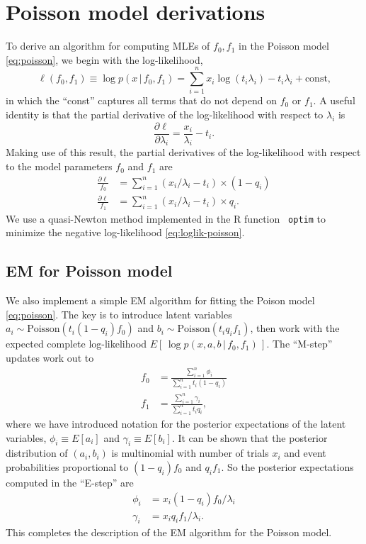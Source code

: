 \documentclass[final]{siamart171218}
\begin{document}
\section{Poisson model derivations}

To derive an algorithm for computing MLEs of $f_0, f_1$ in the Poisson
model \eqref{eq:poisson}, we begin with the log-likelihood,
\begin{equation}
\ell(f_0, f_1) \equiv \log p(x \,|\, f_0, f_1) = 
\sum_{i=1}^n x_i \log (t_i \lambda_i) - t_i \lambda_i +
\mbox{const,}
\label{eq:loglik-poisson}
\end{equation}
in which the ``const'' captures all terms that do not depend on $f_0$
or $f_1$. A useful identity is that the partial derivative of the
log-likelihood with respect to $\lambda_i$ is
\begin{equation*}
\frac{\partial\ell}{\partial\lambda_i} = \frac{x_i}{\lambda_i} - t_i.
\end{equation*}
Making use of this result, the partial derivatives of the
log-likelihood with respect to the model parameters $f_0$ and $f_1$
are
\begin{align}
\frac{\partial\ell}{f_0} &= 
\sum_{i=1}^n (x_i/\lambda_i - t_i) \times (1-q_i) \\
\frac{\partial\ell}{f_1} &= 
\sum_{i=1}^n (x_i/\lambda_i - t_i) \times q_i.
\end{align}
We use a quasi-Newton method implemented in the R function {\tt
  optim} to minimize the negative log-likelihood
\eqref{eq:loglik-poisson}.

\subsection{EM for Poisson model} 

We also implement a simple EM algorithm for fitting the Poison model
\eqref{eq:poisson}. The key is to introduce latent variables $a_i \sim
\mathrm{Poisson}(t_i (1-q_i) f_0)$ and $b_i \sim \mathrm{Poisson}(t_i
q_i f_1)$, then work with the expected complete log-likelihood
$E[\,\log p(x, a, b \,|\, f_0, f_1)\,]$. The ``M-step'' updates work
out to
\begin{align}
f_0 &= \frac{\sum_{i=1}^n \phi_i}{\sum_{i=1}^n t_i(1-q_i)} \\
f_1 &= \frac{\sum_{i=1}^n \gamma_i}{\sum_{i=1}^n t_i q_i},
\end{align}
where we have introduced notation for the posterior expectations of
the latent variables, $\phi_i \equiv E[a_i]$ and $\gamma_i \equiv
E[b_i]$. It can be shown that the posterior distribution of $(a_i,
b_i)$ is multinomial with number of trials $x_i$ and event
probabilities proportional to $(1-q_i) f_0$ and $q_i f_1$. So the
posterior expectations computed in the ``E-step'' are
\begin{align}
\phi_i   &= x_i (1 - q_i) f_0 / \lambda_i \\
\gamma_i &= x_i q_i f_1 / \lambda_i.
\end{align}
This completes the description of the EM algorithm for the Poisson
model.
\end{document}

